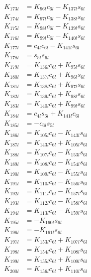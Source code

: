 \begin{multicols}{2}
\begin{align}
K_{173l} &= K_{96l}c_{6l} - K_{137l}s_{6l} \nonumber \\
K_{174l} &= K_{97l}c_{6l} - K_{138l}s_{6l} \nonumber \\
K_{175l} &= K_{98l}c_{6l} - K_{139l}s_{6l} \nonumber \\
K_{176l} &= K_{99l}c_{6l} - K_{140l}s_{6l} \nonumber \\
K_{177l} &= c_{4l}c_{6l} - K_{141l}s_{6l} \nonumber \\
K_{178l} &= s_{5l}s_{6l} \nonumber \\
K_{179l} &= K_{136l}c_{6l} + K_{95l}s_{6l} \nonumber \\
K_{180l} &= K_{137l}c_{6l} + K_{96l}s_{6l} \nonumber \\
K_{181l} &= K_{138l}c_{6l} + K_{97l}s_{6l} \nonumber \\
K_{182l} &= K_{139l}c_{6l} + K_{98l}s_{6l} \nonumber \\
K_{183l} &= K_{140l}c_{6l} + K_{99l}s_{6l} \nonumber \\
K_{184l} &= c_{4l}s_{6l} + K_{141l}c_{6l} \nonumber \\
K_{185l} &= -c_{6l}s_{5l} \nonumber \\
K_{186l} &= K_{105l}c_{6l} - K_{143l}s_{6l} \nonumber \\
K_{187l} &= K_{143l}c_{6l} + K_{105l}s_{6l} \nonumber \\
K_{188l} &= K_{107l}c_{6l} - K_{153l}s_{6l} \nonumber \\
K_{189l} &= K_{108l}c_{6l} - K_{154l}s_{6l} \nonumber \\
K_{190l} &= K_{109l}c_{6l} - K_{155l}s_{6l} \nonumber \\
K_{191l} &= K_{110l}c_{6l} - K_{156l}s_{6l} \nonumber \\
K_{192l} &= K_{111l}c_{6l} - K_{157l}s_{6l} \nonumber \\
K_{193l} &= K_{112l}c_{6l} - K_{158l}s_{6l} \nonumber \\
K_{194l} &= K_{113l}c_{6l} - K_{159l}s_{6l} \nonumber \\
K_{195l} &= -K_{160l}s_{6l} \nonumber \\
K_{196l} &= -K_{161l}s_{6l} \nonumber \\
K_{197l} &= K_{153l}c_{6l} + K_{107l}s_{6l} \nonumber \\
K_{198l} &= K_{154l}c_{6l} + K_{108l}s_{6l} \nonumber \\
K_{199l} &= K_{155l}c_{6l} + K_{109l}s_{6l} \nonumber \\
K_{200l} &= K_{156l}c_{6l} + K_{110l}s_{6l} \nonumber \\

\end{align}
\end{multicols}
